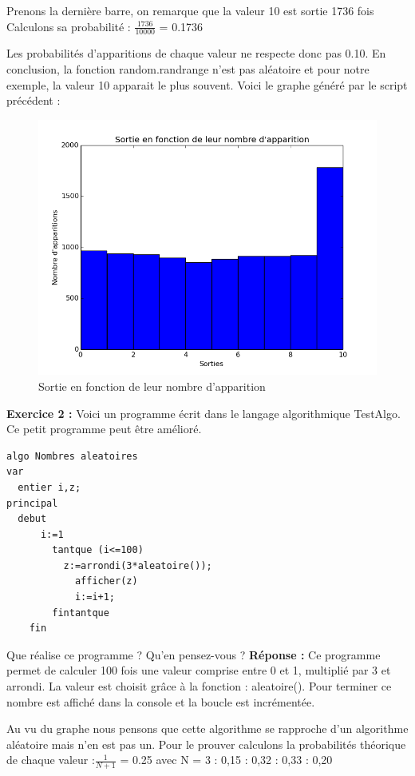\documentclass{book}
\begin{document}
Prenons la dernière barre, on remarque que la valeur 10 est sortie 1736 fois Calculons sa probabilité : $\frac{1736}{10000}$ = 0.1736

Les probabilités d'apparitions de chaque valeur ne respecte donc pas 0.10. En conclusion, la fonction random.randrange n'est pas aléatoire et pour notre exemple, la valeur 10 apparait le plus souvent.
\newpage
Voici le graphe généré par le script précédent : 
\begin{figure}[h!]
	\centering
	\includegraphics[width=\textwidth]{Nombre_pseudo-aleatoires_exo1.png}
	\caption{Sortie en fonction de leur nombre d'apparition}
	\label{fig:cc40}
\end{figure}
\newline
\textbf{Exercice 2 :}
Voici un programme écrit dans le langage algorithmique TestAlgo.
Ce petit programme peut être amélioré.
\begin{lstlisting}[frame=single]
algo Nombres aleatoires
var
  entier i,z;
principal
  debut
	  i:=1
		tantque (i<=100)
		  z:=arrondi(3*aleatoire());
			afficher(z)
			i:=i+1;
		fintantque
	fin
\end{lstlisting} 
\newpage Que réalise ce programme ? Qu'en pensez-vous ? \newline 
\textbf{Réponse :} \newline
Ce programme permet de calculer 100 fois une valeur comprise entre 0 et 1, multiplié par 3 et arrondi. La valeur est choisit grâce à la fonction : aleatoire(). Pour terminer ce nombre est affiché dans la console et la boucle est incrémentée.

Au vu du graphe nous pensons que cette algorithme se rapproche d'un algorithme aléatoire mais n'en est pas un. Pour le prouver calculons la probabilités théorique de chaque valeur :\newline \newline $\frac{1}{N+1}$ = 0.25 avec N = 3 \newline {} : 0,15  : 0,32  : 0,33  : 0,20 \newline
\end{document}
